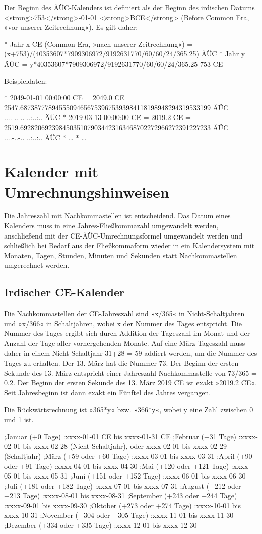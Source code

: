 Der Beginn des ÄÜC-Kalenders ist definiert als der Beginn des irdischen Datums <strong>753</strong>-01-01 <strong>BCE</strong> (Before Common Era, »vor unserer Zeitrechnung«). Es gilt daher:

* Jahr x CE (Common Era, »nach unserer Zeitrechnung«) = (x+753)/(40353607*7909306972/9192631770/60/60/24/365.25) ÄÜC
* Jahr y ÄÜC = y*40353607*7909306972/9192631770/60/60/24/365.25-753 CE

Beispieldaten:

* 2049-01-01 00:00:00 CE = 2049.0 CE = 2547.687387778945550946567539675393984118198948294319533199 ÄÜC = ....-..-.. ..:..:.. ÄÜC
* 2019-03-13 00:00:00 CE = 2019.2 CE = 2519.692820692398450351079034423163468702272966272391227233 ÄÜC = ....-..-.. ..:..:.. ÄÜC
* …
* …


\section{Kalender mit Umrechnungshinweisen}

Die Jahreszahl mit Nachkommastellen ist entscheidend. Das Datum eines Kalenders muss in eine Jahres-Fließkommazahl umgewandelt werden, anschließend mit der CE-ÄÜC-Umrechnungsformel umgewandelt werden und schließlich bei Bedarf aus der Fließkommaform wieder in ein Kalendersystem mit Monaten, Tagen, Stunden, Minuten und Sekunden statt Nachkommastellen umgerechnet werden.

\subsection{Irdischer CE-Kalender}

Die Nachkommastellen der CE-Jahreszahl sind »x/365« in Nicht-Schaltjahren und »x/366« in Schaltjahren, wobei x der Nummer des Tages entspricht. Die Nummer des Tages ergibt sich durch Addition der Tageszahl im Monat und der Anzahl der Tage aller vorhergehenden Monate. Auf eine März-Tageszahl muss daher in einem Nicht-Schaltjahr 31+28 = 59 addiert werden, um die Nummer des Tages zu erhalten. Der 13. März hat die Nummer 73. Der Beginn der ersten Sekunde des 13. März entspricht einer Jahreszahl-Nachkommastelle von 73/365 = 0.2. Der Beginn der ersten Sekunde des 13. März 2019 CE ist exakt »2019.2 CE«. Seit Jahresbeginn ist dann exakt ein Fünftel des Jahres vergangen.

Die Rückwärtsrechnung ist »365*y« bzw. »366*y«, wobei y eine Zahl zwischen 0 und 1 ist.

;Januar (+0 Tage)
:xxxx-01-01 CE bis xxxx-01-31 CE
;Februar (+31 Tage)
:xxxx-02-01 bis xxxx-02-28 (Nicht-Schaltjahr), oder xxxx-02-01 bis xxxx-02-29 (Schaltjahr)
;März (+59 oder +60 Tage)
:xxxx-03-01 bis xxxx-03-31
;April (+90 oder +91 Tage)
:xxxx-04-01 bis xxxx-04-30
;Mai (+120 oder +121 Tage)
:xxxx-05-01 bis xxxx-05-31
;Juni (+151 oder +152 Tage)
:xxxx-06-01 bis xxxx-06-30
;Juli (+181 oder +182 Tage)
:xxxx-07-01 bis xxxx-07-31
;August (+212 oder +213 Tage)
:xxxx-08-01 bis xxxx-08-31
;September (+243 oder +244 Tage)
:xxxx-09-01 bis xxxx-09-30
;Oktober (+273 oder +274 Tage)
:xxxx-10-01 bis xxxx-10-31
;November (+304 oder +305 Tage)
:xxxx-11-01 bis xxxx-11-30
;Dezember (+334 oder +335 Tage)
:xxxx-12-01 bis xxxx-12-30

